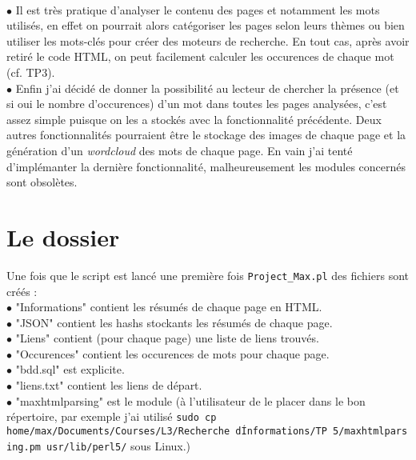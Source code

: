 \documentclass[11pt]{article}
\begin{document}
\\ $\bullet$ Il est très pratique d'analyser le contenu des pages et notamment les mots utilisés, en effet on pourrait alors catégoriser les pages selon leurs thèmes ou bien utiliser les mots-clés pour créer des moteurs de recherche. En tout cas, après avoir retiré le code HTML, on peut facilement calculer les occurences de chaque mot (cf. TP3).
\\ $\bullet$ Enfin j'ai décidé de donner la possibilité au lecteur de chercher la présence (et si oui le nombre d'occurences) d'un mot dans toutes les pages analysées, c'est assez simple puisque on les a stockés avec la fonctionnalité précédente.
\bigskip
\newline 
Deux autres fonctionnalités pourraient être le stockage des images de chaque page et la génération d'un \emph{wordcloud} des mots de chaque page. En vain j'ai tenté d'implémanter la dernière fonctionnalité, malheureusement les modules concernés sont obsolètes.
\section{Le dossier}
Une fois que le script est lancé une première fois \texttt{Project\_Max.pl} des fichiers sont créés :
\\ $\bullet$ "Informations" contient les résumés de chaque page en HTML.
\\ $\bullet$ "JSON" contient les hashs stockants les résumés de chaque page.
\\ $\bullet$ "Liens" contient (pour chaque page) une liste de liens trouvés.
\\ $\bullet$ "Occurences" contient les occurences de mots pour chaque page.
\\ $\bullet$ "bdd.sql" est explicite.
\\ $\bullet$ "liens.txt" contient les liens de départ.
\\ $\bullet$ "maxhtmlparsing" est le module (à l'utilisateur de le placer dans le bon répertoire, par exemple j'ai utilisé \texttt{sudo cp home/max/Documents/Courses/L3/Recherche\ d\'Informations/TP\ 5/maxhtmlparsing.pm usr/lib/perl5/} sous Linux.)
\end{document}
